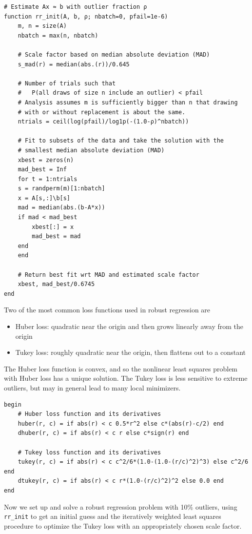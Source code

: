 \documentclass[12pt, leqno]{article} %
\providecommand{\tightlist}{%
  \setlength{\itemsep}{0pt}\setlength{\parskip}{0pt}}
\begin{document}
\begin{verbatim}
# Estimate Ax ≈ b with outlier fraction ρ
function rr_init(A, b, ρ; nbatch=0, pfail=1e-6)
    m, n = size(A)
    nbatch = max(n, nbatch)
    
    # Scale factor based on median absolute deviation (MAD)
    s_mad(r) = median(abs.(r))/0.645
    
    # Number of trials such that
    #   P(all draws of size n include an outlier) < pfail
    # Analysis assumes m is sufficiently bigger than n that drawing
    # with or without replacement is about the same.
    ntrials = ceil(log(pfail)/log1p(-(1.0-ρ)^nbatch))
    
    # Fit to subsets of the data and take the solution with the
    # smallest median absolute deviation (MAD)
    xbest = zeros(n)
    mad_best = Inf
    for t = 1:ntrials
	s = randperm(m)[1:nbatch]
	x = A[s,:]\b[s]
	mad = median(abs.(b-A*x))
	if mad < mad_best
	    xbest[:] = x
	    mad_best = mad
	end
    end
    
    # Return best fit wrt MAD and estimated scale factor
    xbest, mad_best/0.6745
end
\end{verbatim}

Two of the most common loss functions used in robust regression are

\begin{itemize}
\tightlist
\item
  Huber loss: quadratic near the origin and then grows linearly away
  from the origin
\item
  Tukey loss: roughly quadratic near the origin, then flattens out to a
  constant
\end{itemize}

The Huber loss function is convex, and so the nonlinear least squares
problem with Huber loss has a unique solution. The Tukey loss is less
sensitive to extreme outliers, but may in general lead to many local
minimizers.

\begin{verbatim}
begin
    # Huber loss function and its derivatives
    huber(r, c) = if abs(r) < c 0.5*r^2 else c*(abs(r)-c/2) end
    dhuber(r, c) = if abs(r) < c r else c*sign(r) end
    
    # Tukey loss function and its derivatives
    tukey(r, c) = if abs(r) < c c^2/6*(1.0-(1.0-(r/c)^2)^3) else c^2/6 end
    dtukey(r, c) = if abs(r) < c r*(1.0-(r/c)^2)^2 else 0.0 end
end
\end{verbatim}

Now we set up and solve a robust regression problem with 10\% outliers,
using \texttt{rr\_init} to get an initial guess and the iteratively
weighted least squares procedure to optimize the Tukey loss with an
appropriately chosen scale factor.
\end{document}
